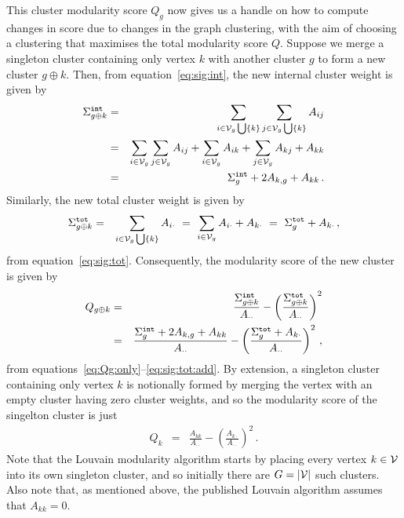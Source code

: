 \documentclass[a4paper]{article}
\begin{document}
This cluster modularity score $Q_g$ now gives us a handle on how to compute changes in score
due to changes in the graph clustering, with the aim of choosing a clustering that maximises
the total modularity score $Q$.
Suppose we merge a singleton cluster containing only vertex $k$ with another cluster $g$ to form a new
cluster $g\oplus k$. Then, from equation~\eqref{eq:sig:int}, the new internal cluster weight is
given by
\begin{eqnarray}
   \Sigma_{g\oplus k}^{\tt int} & = & \sum_{i\in{\cal V}_g\bigcup\{k\}}
   \sum_{j\in{\cal V}_g\bigcup\{k\}} A_{ij}
\nonumber\\&=&
    \sum_{i\in{\cal V}_g}\sum_{j\in{\cal V}_g} A_{ij}
    +\sum_{i\in{\cal V}_g}A_{ik}+\sum_{j\in{\cal V}_g}A_{kj}+A_{kk}
\nonumber\\&=&
    \Sigma_g^{\tt int}+2A_{k,g}+A_{kk}\,.
\label{eq:sig:int:add}
\end{eqnarray}
Similarly, the new total cluster weight is given by
\begin{eqnarray}
    \Sigma_{g\oplus k}^{\tt tot} & = & \sum_{i\in{\cal V}_g\bigcup\{k\}} A_{i\cdot}
~=~
    \sum_{i\in{\cal V}_g} A_{i\cdot}+A_{k\cdot}
    ~=~\Sigma_{g}^{\tt tot}+A_{k\cdot}\,,
\label{eq:sig:tot:add}
\end{eqnarray}
from equation~\eqref{eq:sig:tot}.
Consequently, the modularity score of the new cluster is given by
\begin{eqnarray}
Q_{g\oplus k} & = & 
\frac{\Sigma_{g\oplus k}^{\tt int}}{A_{\cdot\cdot}}
    -\left(\frac{\Sigma_{g\oplus k}^{\tt tot}}{A_{\cdot\cdot}}\right)^2
\nonumber\\& = &
\frac{\Sigma_{g}^{\tt int}+2A_{k,g}+A_{kk}}{A_{\cdot\cdot}}
    -\left(\frac{\Sigma_{g}^{\tt tot}+A_{k\cdot}}{A_{\cdot\cdot}}\right)^2\,,
\label{eq:Qgpk}
\end{eqnarray}
from equations~\eqref{eq:Qg:only}--\eqref{eq:sig:tot:add}.
By extension, a singleton cluster containing only vertex $k$ is notionally
formed by merging the vertex with an empty cluster having zero cluster weights, and so the
modularity score of the singelton cluster is just
\begin{eqnarray}
    Q_k & = & \frac{A_{kk}}{A_{\cdot\cdot}}
    -\left(\frac{A_{k\cdot}}{A_{\cdot\cdot}}\right)^2\,.
\label{eq:Qk}
\end{eqnarray}
Note that the Louvain modularity algorithm starts by placing every vertex $k\in{\cal V}$ into
its own singleton cluster, and so initially there are $G=|{\cal V}|$ such clusters.
Also note that, as mentioned above, the published Louvain algorithm assumes that $A_{kk}=0$.
\end{document}
